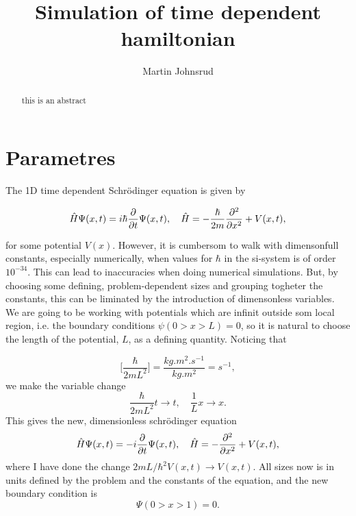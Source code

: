 \documentclass{article}
\title{Simulation of time dependent hamiltonian}
\author{Martin Johnsrud}
\date{}
\begin{document}
\maketitle
\begin{abstract}
    this is an abstract
\end{abstract}

\section*{Parametres}

    The 1D time dependent Schrödinger equation is given by

    \begin{equation*}
        \hat H \Psi(x, t) = i \hbar \pdv{t} \Psi(x, t), \quad \hat H = -\frac{\hbar}{2m}\pdv[2]{x} + V(x, t),
    \end{equation*}

    for some potential $V(x)$. However, it is cumbersom to walk with dimensonfull constants, especially numerically, when values for $\hbar$ in the si-system is of order $10^{-34}$. This can lead to inaccuracies when doing numerical simulations. But, by choosing some defining, problem-dependent sizes and grouping togheter the constants, this can be liminated by the introduction of dimensonless variables. We are going to be working with potentials which are infinit outside som local region, i.e. the boundary conditions $\psi(0>x>L) = 0$, so it is natural to choose the length of the potential, $L$, as a defining quantity. Noticing that

    \begin{equation*}
        \bigg[\frac{\hbar}{2 m L^2} \bigg] = \frac{\si{kg.m^2.s^{-1}}}{\si{kg.m^2}} = \si{s^{-1}},
    \end{equation*}
    we make the variable change
    \begin{equation*}
        \frac{\hbar}{2 m L^2}t \rightarrow t, \quad \frac{1}{L}x \rightarrow x.
    \end{equation*}
    This gives the new, dimensionless schrödinger equation
    \begin{equation}
        \hat H \Psi(x, t) = -i \pdv{t} \Psi(x, t), \quad \hat H = -\pdv[2]{x} + V(x, t),
        \label{time_depend}
    \end{equation}
    where I have done the change $2mL/\hbar^2V(x, t) \rightarrow V(x, t)$. All sizes now is in units defined by the problem and the constants of the equation, and the new boundary condition is 
    \begin{equation*}
        \Psi(0>x>1) = 0.
    \end{equation*}
\end{document}
